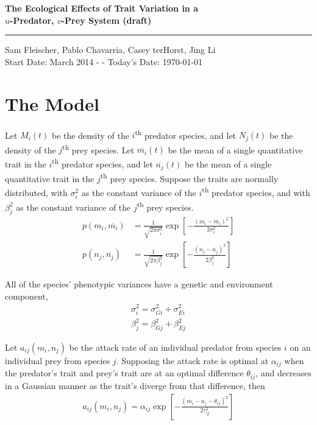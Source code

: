 \documentclass[12pt]{article}
\begin{document}
\begin{center}
	{\bf\LARGE The Ecological Effects of Trait Variation in a\\ \vskip 5pt$u$-Predator, $v$-Prey System \small (draft)}\\ \vskip 3pt \rule{4cm}{0.4pt}
	\vskip 5pt
	Sam Fleischer, Pablo Chavarria, Casey terHorst, Jing Li \\ Start Date:  March 2014 - - Today's Date: \today \rm
\end{center}

\vskip 15pt

									\section{The Model}

Let $M_i(t)$ be the density of the $i$\textsuperscript{th} predator species, and let $N_j(t)$ be the density of the $j$\textsuperscript{th} prey species.  Let $\overline{m_i}(t)$ be the mean of a single quantitative trait in the $i$\textsuperscript{th} predator species, and let $\overline{n_j}(t)$ be the mean of a single quantitative trait in the $j$\textsuperscript{th} prey species.  Suppose the traits are normally distributed, with $\sigma_i^2$ as the constant variance of the $i$\textsuperscript{th} predator species, and with $\beta_j^2$ as the constant variance of the $j$\textsuperscript{th} prey species.
\begin{align*}
	p(m_i, \overline{m_i}) &= \frac{1}{\sqrt{2\pi\sigma_i^2}}\exp\left[{-\frac{(m_i - \overline{m_i})^2}{2\sigma_i^2}}\right] \\
	p(n_j, \overline{n_j}) &= \frac{1}{\sqrt{2\pi\beta_j^2}}\exp\left[{-\frac{(n_j - \overline{n_j})^2}{2\beta_j^2}}\right]
\end{align*}

\noindent All of the species' phenotypic variances have a genetic and environment component,
\begin{align*}
	\sigma_i^2 = \sigma_{Gi}^2 + \sigma_{Ei}^2 \\
	\beta_j^2 = \beta_{Gj}^2 + \beta_{Ej}^2
\end{align*}

\noindent Let $a_{ij}(m_i, n_j)$ be the attack rate of an individual predator from species $i$ on an individual prey from species $j$.  Supposing the attack rate is optimal at $\alpha_{ij}$ when the predator's trait and prey's trait are at an optimal difference $\theta_{ij}$, and decreases in a Gaussian manner as the trait's diverge from that difference, then
\begin{align*}
	a_{ij}(m_i, n_j) = \alpha_{ij} \exp\left[{-\frac{(m_i - n_j - \theta_{ij})^2}{2\tau_{ij}^2}}\right]
\end{align*}
\end{document}
